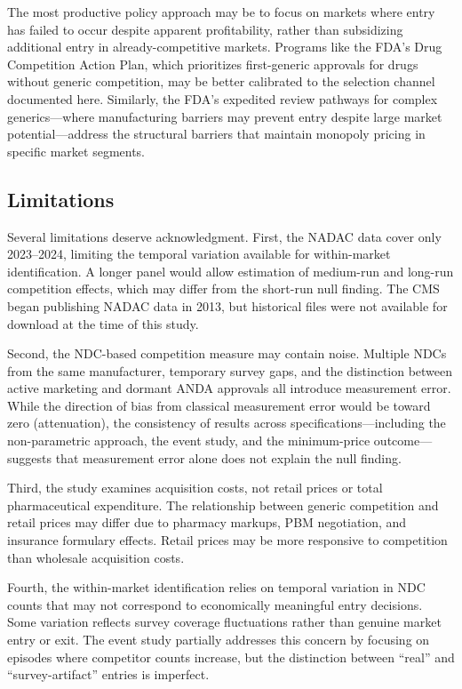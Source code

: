 \documentclass[12pt]{article}
\begin{document}
The most productive policy approach may be to focus on markets where entry has failed to occur despite apparent profitability, rather than subsidizing additional entry in already-competitive markets. Programs like the FDA's Drug Competition Action Plan, which prioritizes first-generic approvals for drugs without generic competition, may be better calibrated to the selection channel documented here. Similarly, the FDA's expedited review pathways for complex generics---where manufacturing barriers may prevent entry despite large market potential---address the structural barriers that maintain monopoly pricing in specific market segments.

\subsection{Limitations}

Several limitations deserve acknowledgment. First, the NADAC data cover only 2023--2024, limiting the temporal variation available for within-market identification. A longer panel would allow estimation of medium-run and long-run competition effects, which may differ from the short-run null finding. The CMS began publishing NADAC data in 2013, but historical files were not available for download at the time of this study.

Second, the NDC-based competition measure may contain noise. Multiple NDCs from the same manufacturer, temporary survey gaps, and the distinction between active marketing and dormant ANDA approvals all introduce measurement error. While the direction of bias from classical measurement error would be toward zero (attenuation), the consistency of results across specifications---including the non-parametric approach, the event study, and the minimum-price outcome---suggests that measurement error alone does not explain the null finding.

Third, the study examines acquisition costs, not retail prices or total pharmaceutical expenditure. The relationship between generic competition and retail prices may differ due to pharmacy markups, PBM negotiation, and insurance formulary effects. Retail prices may be more responsive to competition than wholesale acquisition costs.

Fourth, the within-market identification relies on temporal variation in NDC counts that may not correspond to economically meaningful entry decisions. Some variation reflects survey coverage fluctuations rather than genuine market entry or exit. The event study partially addresses this concern by focusing on episodes where competitor counts increase, but the distinction between ``real'' and ``survey-artifact'' entries is imperfect.
\end{document}
